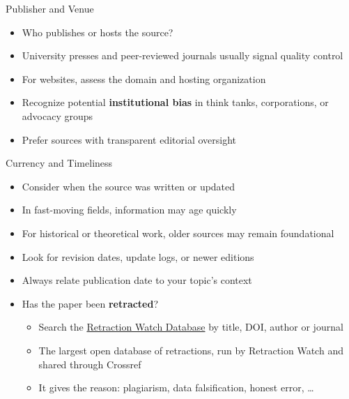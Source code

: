 \documentclass[aspectratio=169]{beamer}
\begin{document}
\begin{frame}{Publisher and Venue}
\begin{itemize}
  \item Who publishes or hosts the source?
  \item University presses and peer-reviewed journals usually signal quality control
  \item For websites, assess the domain and hosting organization
  \item Recognize potential \textbf{institutional bias} in think tanks, corporations, or advocacy groups
  \item Prefer sources with transparent editorial oversight
\end{itemize}
\end{frame}

\begin{frame}{Currency and Timeliness}
\begin{itemize}
  \item Consider when the source was written or updated
  \item In fast-moving fields, information may age quickly
  \item For historical or theoretical work, older sources may remain foundational
  \item Look for revision dates, update logs, or newer editions
  \item Always relate publication date to your topic’s context
  \item Has the paper been \textbf{retracted}?
    \begin{itemize}
    \item Search the \href{https://retractiondatabase.org}{Retraction Watch Database} by title, DOI, author or journal
    \item The largest open database of retractions, run by Retraction Watch and shared through Crossref
    \item It gives the reason: plagiarism, data falsification, honest error, \ldots
    \end{itemize}
\end{itemize}
\end{frame}
\end{document}
